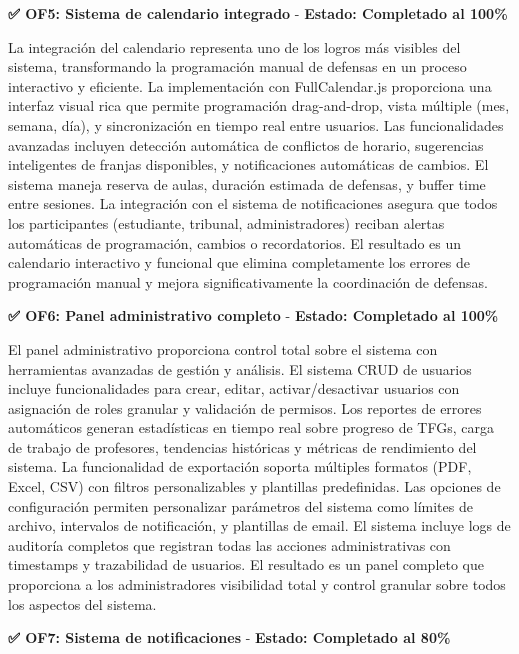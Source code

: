 \documentclass[12pt,a4paper,oneside]{report}
\begin{document}
\textbf{✅ OF5: Sistema de calendario integrado} - \textbf{Estado: Completado al 100\%}

La integración del calendario representa uno de los logros más visibles del sistema, transformando la programación manual de defensas en un proceso interactivo y eficiente. La implementación con FullCalendar.js proporciona una interfaz visual rica que permite programación drag-and-drop, vista múltiple (mes, semana, día), y sincronización en tiempo real entre usuarios. Las funcionalidades avanzadas incluyen detección automática de conflictos de horario, sugerencias inteligentes de franjas disponibles, y notificaciones automáticas de cambios. El sistema maneja reserva de aulas, duración estimada de defensas, y buffer time entre sesiones. La integración con el sistema de notificaciones asegura que todos los participantes (estudiante, tribunal, administradores) reciban alertas automáticas de programación, cambios o recordatorios. El resultado es un calendario interactivo y funcional que elimina completamente los errores de programación manual y mejora significativamente la coordinación de defensas.

\textbf{✅ OF6: Panel administrativo completo} - \textbf{Estado: Completado al 100\%}

El panel administrativo proporciona control total sobre el sistema con herramientas avanzadas de gestión y análisis. El sistema CRUD de usuarios incluye funcionalidades para crear, editar, activar/desactivar usuarios con asignación de roles granular y validación de permisos. Los reportes de errores automáticos generan estadísticas en tiempo real sobre progreso de TFGs, carga de trabajo de profesores, tendencias históricas y métricas de rendimiento del sistema. La funcionalidad de exportación soporta múltiples formatos (PDF, Excel, CSV) con filtros personalizables y plantillas predefinidas. Las opciones de configuración permiten personalizar parámetros del sistema como límites de archivo, intervalos de notificación, y plantillas de email. El sistema incluye logs de auditoría completos que registran todas las acciones administrativas con timestamps y trazabilidad de usuarios. El resultado es un panel completo que proporciona a los administradores visibilidad total y control granular sobre todos los aspectos del sistema.

\textbf{✅ OF7: Sistema de notificaciones} - \textbf{Estado: Completado al 80\%}
\end{document}
